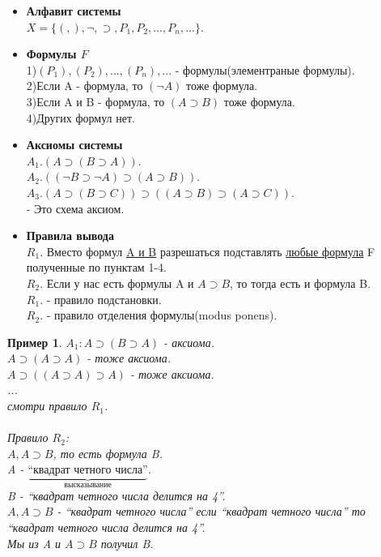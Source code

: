 \documentclass{article}
\newtheorem{example}{Пример}
\numberwithin{example}{section}
\numberwithin{question}{section}
\numberwithin{Remark}{section}
\numberwithin{theorem}{section}
\numberwithin{definition}{section}
\numberwithin{proposition}{section}
\begin{document}
\begin{itemize}
	\item \textbf{Алфавит системы}\\ 
	$X=\{(,),\lnot,\supset,P_1,P_2,...,P_n,...\}$.
	\item \textbf{Формулы $F$}\\
	1)$(P_1),(P_2),...,(P_n),...$ - формулы(элементраные формулы).\\
	2)Если A - формула, то $(\lnot A)$ тоже формула.\\
	3)Если A и B - формула, то $(A\supset B)$ тоже формула.\\
	4)Других формул нет.
	\item \textbf{Аксиомы системы}\\
	$A_1.(A\supset (B\supset A))$.\\
	$A_2.((\lnot B\supset \lnot A)\supset (A\supset B))$.\\
	$A_3.(A\supset (B\supset C))\supset ((A\supset B)\supset (A\supset C))$.\\
	- Это схема аксиом.
	\item \textbf{Правила вывода}\\
	$R_1$. Вместо формул \underline{A и B} разрешаться подставлять \underline{любые формула} F полученные по пунктам 1-4.\\
	$R_2$. Если у нас есть формулы A и $A\supset B$, то тогда есть и формула B.\\
	$R_1$. - правило подстановки.\\
	$R_2$. - правило отделения формулы(modus ponens).\\
\end{itemize}
\begin{example}
	$A_1: A\supset (B\supset A)$ - аксиома.\\
	$A\supset (A\supset A)$ - тоже аксиома.\\
	$A\supset((A\supset A)\supset A)$ - тоже аксиома.\\
	...\\
	смотри правило $R_1$.\\
	\\
	Правило $R_2$:\\
	$A,A\supset B$, то есть формула B.\\
	A - $\underbrace{\text{``квадрат четного числа''}}_{\text{высказывание}}$.\\
	B - ``квадрат четного числа делится на 4''.\\
	$A,A\supset B$ - ``квадрат четного числа'' если ``квадрат четного числа'' то ``квадрат четного числа делится на 4''.\\
	Мы из A и $A\supset B$ получил B.
\end{example}
\end{document}
